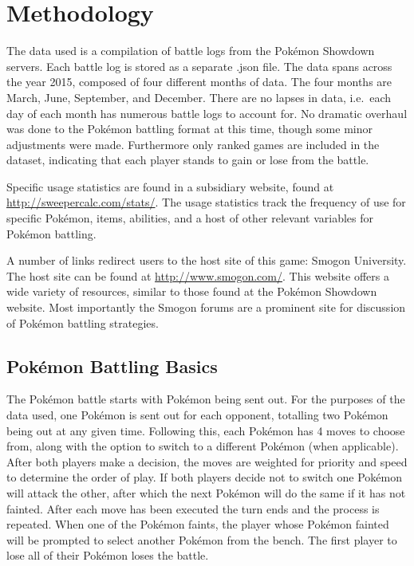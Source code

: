 \documentclass[12pt,twoside]{reedthesis}
\begin{document}
  \section{Methodology}\label{methodology}
  
  The data used is a compilation of battle logs from the Pokémon Showdown
  servers. Each battle log is stored as a separate .json file. The data
  spans across the year 2015, composed of four different months of data.
  The four months are March, June, September, and December. There are no
  lapses in data, i.e.~each day of each month has numerous battle logs to
  account for. No dramatic overhaul was done to the Pokémon battling
  format at this time, though some minor adjustments were made.
  Furthermore only ranked games are included in the dataset, indicating
  that each player stands to gain or lose from the battle.
  
  Specific usage statistics are found in a subsidiary website, found at
  \url{http://sweepercalc.com/stats/}. The usage statistics track the
  frequency of use for specific Pokémon, items, abilities, and a host of
  other relevant variables for Pokémon battling.
  
  A number of links redirect users to the host site of this game: Smogon
  University. The host site can be found at \url{http://www.smogon.com/}.
  This website offers a wide variety of resources, similar to those found
  at the Pokémon Showdown website. Most importantly the Smogon forums are
  a prominent site for discussion of Pokémon battling strategies.
  
  \subsection{Pokémon Battling Basics}\label{pokemon-battling-basics}
  
  The Pokémon battle starts with Pokémon being sent out. For the purposes
  of the data used, one Pokémon is sent out for each opponent, totalling
  two Pokémon being out at any given time. Following this, each Pokémon
  has 4 moves to choose from, along with the option to switch to a
  different Pokémon (when applicable). After both players make a decision,
  the moves are weighted for priority and speed to determine the order of
  play. If both players decide not to switch one Pokémon will attack the
  other, after which the next Pokémon will do the same if it has not
  fainted. After each move has been executed the turn ends and the process
  is repeated. When one of the Pokémon faints, the player whose Pokémon
  fainted will be prompted to select another Pokémon from the bench. The
  first player to lose all of their Pokémon loses the battle.
  
\end{document}
